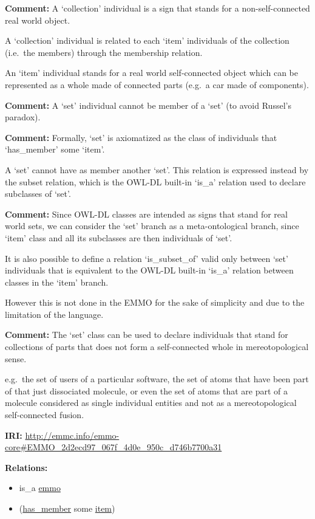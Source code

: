 \documentclass[a4paper,]{report}
\providecommand{\tightlist}{%
  \setlength{\itemsep}{0pt}\setlength{\parskip}{0pt}}
\begin{document}
\textbf{Comment:} A `collection' individual is a sign that stands for a
non-self-connected real world object.

A `collection' individual is related to each `item' individuals of the
collection (i.e.~the members) through the membership relation.

An `item' individual stands for a real world self-connected object which
can be represented as a whole made of connected parts (e.g.~a car made
of components).

\textbf{Comment:} A `set' individual cannot be member of a `set' (to
avoid Russel's paradox).

\textbf{Comment:} Formally, `set' is axiomatized as the class of
individuals that `has\_member' some `item'.

A `set' cannot have as member another `set'. This relation is expressed
instead by the subset relation, which is the OWL-DL built-in `is\_a'
relation used to declare subclasses of `set'.

\textbf{Comment:} Since OWL-DL classes are intended as signs that stand
for real world sets, we can consider the `set' branch as a
meta-ontological branch, since `item' class and all its subclasses are
then individuals of `set'.

It is also possible to define a relation `is\_subset\_of' valid only
between `set' individuals that is equivalent to the OWL-DL built-in
`is\_a' relation between classes in the `item' branch.

However this is not done in the EMMO for the sake of simplicity and due
to the limitation of the language.

\textbf{Comment:} The `set' class can be used to declare individuals
that stand for collections of parts that does not form a self-connected
whole in mereotopological sense.

e.g.~the set of users of a particular software, the set of atoms that
have been part of that just dissociated molecule, or even the set of
atoms that are part of a molecule considered as single individual
entities and not as a mereotopological self-connected fusion.

\textbf{IRI:}
\url{http://emmc.info/emmo-core\#EMMO_2d2ecd97_067f_4d0e_950c_d746b7700a31}

\textbf{Relations:}

\begin{itemize}
\tightlist
\item
  is\_a \protect\hyperlink{emmo}{emmo}
\item
  (\protect\hyperlink{has_member}{has\_member} some
  \protect\hyperlink{item}{item})
\end{itemize}
\end{document}
